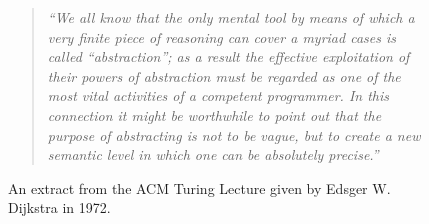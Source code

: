 \begin{figure}[htbp]
	\begin{quote}
		\textit{``We all know that the only mental tool by means of which a very finite piece of reasoning can cover a myriad cases is called ``abstraction''; as a result the effective exploitation of their powers of abstraction must be regarded as one of the most vital activities of a competent programmer. In this connection it might be worthwhile to point out that the purpose of abstracting is not to be vague, but to create a new semantic level in which one can be absolutely precise.''} \cite{abstractions_quote}
	\end{quote}
	\caption{An extract from the ACM Turing Lecture given by Edsger W. Dijkstra in 1972.}
	\label{fig:dijkstra_lecture}
\end{figure}






